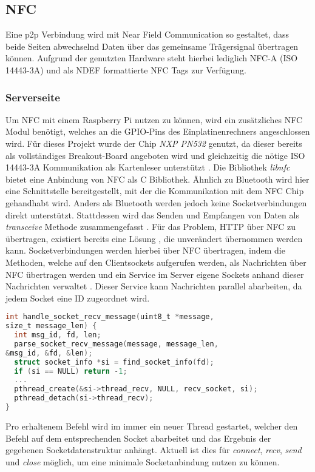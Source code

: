     \subsection{NFC}
        Eine p2p Verbindung wird mit Near Field Communication so gestaltet, dass beide Seiten abwechselnd Daten über das gemeinsame Trägersignal übertragen können.  Aufgrund der genutzten Hardware steht hierbei lediglich NFC-A (ISO 14443-3A) und als NDEF formattierte NFC Tags zur Verfügung.
        
    \subsubsection{Serverseite}
	    Um NFC mit einem Raspberry Pi nutzen zu können, wird ein zusätzliches NFC Modul benötigt, welches an die GPIO-Pins des Einplatinenrechners angeschlossen wird. Für dieses Projekt wurde der Chip {\it NXP PN532} genutzt, da dieser bereits als vollständiges Breakout-Board angeboten wird und gleichzeitig die nötige ISO 14443-3A Kommunikation als Kartenleser unterstützt \cite{nxpChip}.
	    Die Bibliothek {\it libnfc} bietet eine Anbindung von NFC als C Bibliothek. Ähnlich zu Bluetooth wird hier eine Schnittstelle bereitgestellt, mit der die Kommunikation mit dem NFC Chip gehandhabt wird. Anders als Bluetooth werden jedoch keine Socketverbindungen direkt unterstützt. Stattdessen wird das Senden und Empfangen von Daten als {\it transceive} Methode zusammengefasst \cite{libnfc}.
	    Für das Problem, HTTP über NFC zu übertragen, existiert bereits eine Lösung \cite{nfcSocketsBlog}, die unverändert übernommen werden kann. Socketverbindungen werden hierbei über NFC übertragen, indem die Methoden, welche auf den Clientsockets aufgerufen werden, als Nachrichten über NFC übertragen werden und ein Service im Server eigene Sockets anhand dieser Nachrichten verwaltet \cite{nfcSocketsBlog}. Dieser Service kann Nachrichten parallel abarbeiten, da jedem Socket eine ID zugeordnet wird. 
	    \begin{lstlisting}[frame=bt, label={lst:nfc:recv}, language=C, caption=Datenempfang über NFC (Servercode in C) \cite{nfcSocketsServer}]
int handle_socket_recv_message(uint8_t *message,
size_t message_len) {
  int msg_id, fd, len;
  parse_socket_recv_message(message, message_len,
&msg_id, &fd, &len);
  struct socket_info *si = find_socket_info(fd);
  if (si == NULL) return -1;
  ...
  pthread_create(&si->thread_recv, NULL, recv_socket, si);
  pthread_detach(si->thread_recv);
}
        \end{lstlisting}
	    Pro erhaltenem Befehl wird im  immer ein neuer Thread gestartet, welcher den Befehl auf dem entsprechenden Socket abarbeitet und das Ergebnis der gegebenen Socketdatenstruktur anhängt. Aktuell ist dies für {\it connect}, {\it recv}, {\it send} und {\it close} möglich, um eine minimale Socketanbindung nutzen zu können.
